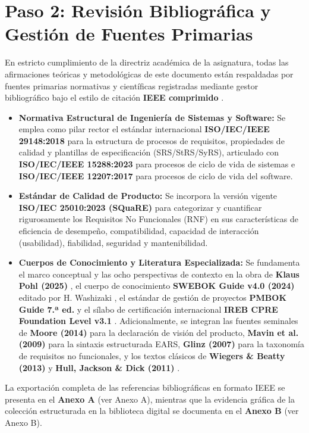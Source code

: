 \documentclass[conference,10pt]{IEEEtran}
\begin{document}
	\section{Paso 2: Revisión Bibliográfica y Gestión de Fuentes Primarias}
	En estricto cumplimiento de la directriz académica de la asignatura, todas las afirmaciones teóricas y metodológicas de este documento están respaldadas por fuentes primarias normativas y científicas registradas mediante gestor bibliográfico bajo el estilo de citación \textbf{IEEE comprimido} \cite{ieee29148, pohl2025, swebok2024}.
	\begin{itemize}
		\item \textbf{Normativa Estructural de Ingeniería de Sistemas y Software:} Se emplea como pilar rector el estándar internacional \textbf{ISO/IEC/IEEE 29148:2018} \cite{ieee29148} para la estructura de procesos de requisitos, propiedades de calidad y plantillas de especificación (SRS/StRS/SyRS), articulado con \textbf{ISO/IEC/IEEE 15288:2023} \cite{ieee15288} para procesos de ciclo de vida de sistemas e \textbf{ISO/IEC/IEEE 12207:2017} \cite{ieee12207} para procesos de ciclo de vida del software.
		\item \textbf{Estándar de Calidad de Producto:} Se incorpora la versión vigente \textbf{ISO/IEC 25010:2023 (SQuaRE)} \cite{iso25010} para categorizar y cuantificar rigurosamente los Requisitos No Funcionales (RNF) en sus características de eficiencia de desempeño, compatibilidad, capacidad de interacción (usabilidad), fiabilidad, seguridad y mantenibilidad.
		\item \textbf{Cuerpos de Conocimiento y Literatura Especializada:} Se fundamenta el marco conceptual y las ocho perspectivas de contexto en la obra de \textbf{Klaus Pohl (2025)} \cite{pohl2025}, el cuerpo de conocimiento \textbf{SWEBOK Guide v4.0 (2024)} editado por H. Washizaki \cite{swebok2024}, el estándar de gestión de proyectos \textbf{PMBOK Guide 7.ª ed.} \cite{pmbok} y el sílabo de certificación internacional \textbf{IREB CPRE Foundation Level v3.1} \cite{ireb2023}. Adicionalmente, se integran las fuentes seminales de \textbf{Moore (2014)} \cite{moore2014} para la declaración de visión del producto, \textbf{Mavin et al. (2009)} \cite{mavin2009ears} para la sintaxis estructurada EARS, \textbf{Glinz (2007)} \cite{glinz2007nfr} para la taxonomía de requisitos no funcionales, y los textos clásicos de \textbf{Wiegers \& Beatty (2013)} \cite{wiegers2013} y \textbf{Hull, Jackson \& Dick (2011)} \cite{hull2011}.
	\end{itemize}
	La exportación completa de las referencias bibliográficas en formato IEEE se presenta en el \textbf{Anexo A} (ver Anexo A), mientras que la evidencia gráfica de la colección estructurada en la biblioteca digital se documenta en el \textbf{Anexo B} (ver Anexo B).
\end{document}
